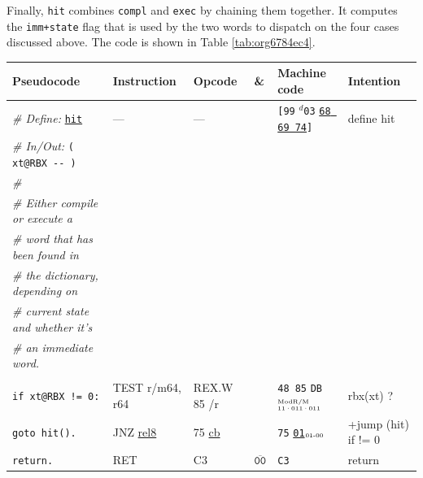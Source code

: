 \documentclass[a4paper,12pt,final]{article}
\begin{document}
\begin{table}[!htbp]
\begin{adjustwidth}{-1cm}{-1cm}
\begin{center}
\end{center}
\normalsize \end{adjustwidth} \end{table} \vspace{0}

Finally, \texttt{hit} combines \texttt{compl} and \texttt{exec} by chaining them together.
It computes the \texttt{imm+state} flag that is used by the two words to
dispatch on the four cases discussed above.  The code is shown in
Table \ref{tab:org6784ec4}.

\begin{table}[!htbp] \begin{adjustwidth}{-1cm}{-1cm} \fontsize{10}{12.000000}\selectfont
\begin{center}
\begin{tabular}{l|ll|l|lH}
\textbf{Pseudocode} & \textbf{Instruction} & \textbf{Opcode} & \textbf{\&} & \textbf{Machine code} & \textbf{Intention}\\[0pt]
\hline
\emph{\# Define:} \uline{\texttt{hit}} & --- & --- &  & \texttt{[99} \(^{d}\)​\texttt{03} \uline{\texttt{68 69 74}}​\texttt{]} & define hit\\[0pt]
\emph{\# In/Out:} \texttt{( xt@RBX -{}-{} )} &  &  &  &  & \\[0pt]
\emph{\#} &  &  &  &  & \\[0pt]
\emph{\# Either compile or execute a} &  &  &  &  & \\[0pt]
\emph{\# word that has been found in} &  &  &  &  & \\[0pt]
\emph{\# the dictionary, depending on} &  &  &  &  & \\[0pt]
\emph{\# current state and whether it's} &  &  &  &  & \\[0pt]
\emph{\# an immediate word.} &  &  &  &  & \\[0pt]
 &  &  &  &  & \\[0pt]
\hspace{1.053000em} \texttt{if xt@RBX != 0:} & TEST r/m64, r64 & REX.W 85 /r &  & \texttt{48 85} \texttt{DB}​\(^{\text{\tiny ModR/M}}_{\text{\tiny 11·011·011}}\) & rbx(xt) ?\\[0pt]
\hspace{2.106000em}   \texttt{goto hit().} & JNZ \uline{rel8} & 75 \uline{cb} &  & \texttt{75} \uline{\texttt{01}}​\(_{\text{\tiny 01-00}}\) & +jump (hit) if != 0\\[0pt]
\hspace{1.053000em} \texttt{return.} & RET & C3 & \(\overline{\texttt{00}}\) & \texttt{C3} & return\\[0pt]

\end{tabular}
\end{center}
\end{adjustwidth}
\end{table}
\end{document}
